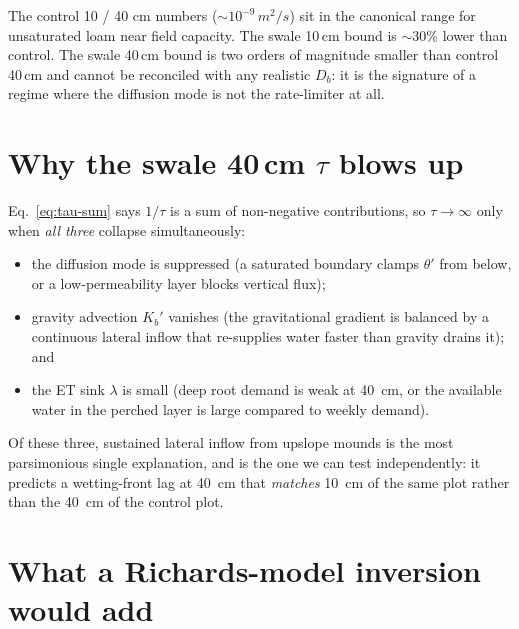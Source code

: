 \documentclass[11pt]{article}
\begin{document}
\noindent The control 10 / 40 \si{cm} numbers ($\sim 10^{-9}\,\si{m^2/s}$) sit in
the canonical range for unsaturated loam near field capacity. The
swale 10\,cm bound is $\sim 30\%$ lower than control. The swale
40\,cm bound is two orders of magnitude smaller than control 40\,cm
and cannot be reconciled with any realistic $D_b$: it is the
signature of a regime where the diffusion mode is not the
rate-limiter at all.

\section{Why the swale 40\,cm $\tau$ blows up}

Eq.~\eqref{eq:tau-sum} says $1/\tau$ is a sum of non-negative
contributions, so $\tau \to \infty$ only when \emph{all three}
collapse simultaneously:
\begin{itemize}
\item the diffusion mode is suppressed (a saturated boundary clamps
      $\theta'$ from below, or a low-permeability layer blocks
      vertical flux);
\item gravity advection $K_b'$ vanishes (the gravitational gradient is
      balanced by a continuous lateral inflow that re-supplies water
      faster than gravity drains it); and
\item the ET sink $\lambda$ is small (deep root demand is weak at
      \SI{40}{cm}, or the available water in the perched layer is large
      compared to weekly demand).
\end{itemize}

Of these three, sustained lateral inflow from upslope mounds is the
most parsimonious single explanation, and is the one we can test
independently: it predicts a wetting-front lag at \SI{40}{cm} that
\emph{matches} \SI{10}{cm} of the same plot rather than the
\SI{40}{cm} of the control plot.

\section{What a Richards-model inversion would add}
\end{document}

